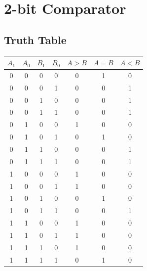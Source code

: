 \documentclass{article}
\begin{document}
\newpage

\section{2-bit Comparator}
\subsection*{Truth Table}
\begin{table}[H]
  \centering
  \begin{tabular}{cc:cc|ccc}
      \toprule
      $A_1$&$A_0$&$B_1$&$B_0$&$A>B$&$A=B$&$A<B$\\
      &0 & 0&0 & 0&1&0\\
      0&0 & 0&1 & 0&0&1\\
      0&0 & 1&0 & 0&0&1\\
      0&0 & 1&1 & 0&0&1\\
      0&1 & 0&0 & 1&0&0\\
      0&1 & 0&1 & 0&1&0\\
      0&1 & 1&0 & 0&0&1\\
      0&1 & 1&1 & 0&0&1\\
      1&0 & 0&0 & 1&0&0\\
      1&0 & 0&1 & 1&0&0\\
      1&0 & 1&0 & 0&1&0\\
      1&0 & 1&1 & 0&0&1\\
      1&1 & 0&0 & 1&0&0\\
      1&1 & 0&1 & 1&0&0\\
      1&1 & 1&0 & 1&0&0\\
      1&1 & 1&1 & 0&1&0\\
      \bottomrule
  \end{tabular}
\end{table}

\newpage
\end{document}
